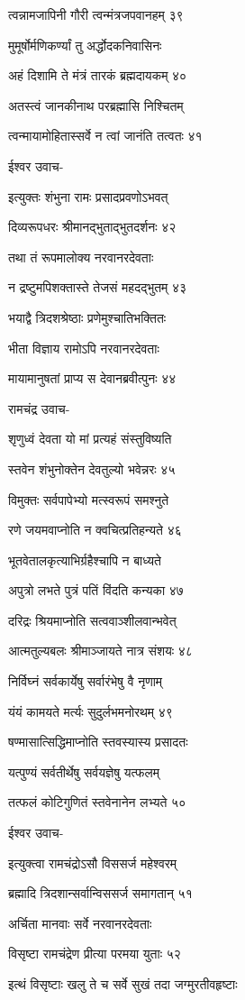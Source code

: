 त्वन्नामजापिनी गौरी त्वन्मंत्रजपवानहम् ३९

मुमूर्षोर्मणिकर्ण्यां तु अर्द्धोदकनिवासिनः

अहं दिशामि ते मंत्रं तारकं ब्रह्मदायकम् ४०

अतस्त्वं जानकीनाथ परब्रह्मासि निश्चितम्

त्वन्मायामोहितास्सर्वे न त्वां जानंति तत्वतः ४१

ईश्वर उवाच-

इत्युक्तः शंभुना रामः प्रसादप्रवणोऽभवत्

दिव्यरूपधरः श्रीमानद्भुताद्भुतदर्शनः ४२

तथा तं रूपमालोक्य नरवानरदेवताः

न द्रष्टुमपिशक्तास्ते तेजसं महदद्भुतम् ४३

भयाद्वै त्रिदशश्रेष्ठाः प्रणेमुश्चातिभक्तितः

भीता विज्ञाय रामोऽपि नरवानरदेवताः

मायामानुषतां प्राप्य स देवानब्रवीत्पुनः ४४

रामचंद्र उवाच-

शृणुध्वं देवता यो मां प्रत्यहं संस्तुविष्यति

स्तवेन शंभुनोक्तेन देवतुल्यो भवेन्नरः ४५

विमुक्तः सर्वपापेभ्यो मत्स्वरूपं समश्नुते

रणे जयमवाप्नोति न क्वचित्प्रतिहन्यते ४६

भूतवेतालकृत्याभिर्ग्रहैश्चापि न बाध्यते

अपुत्रो लभते पुत्रं पतिं विंदति कन्यका ४७

दरिद्रः श्रियमाप्नोति सत्ववाञ्शीलवान्भवेत्

आत्मतुल्यबलः श्रीमाञ्जायते नात्र संशयः ४८

निर्विघ्नं सर्वकार्येषु सर्वारंभेषु वै नृणाम्

यंयं कामयते मर्त्यः सुदुर्लभमनोरथम् ४९

षण्मासात्सिद्धिमाप्नोति स्तवस्यास्य प्रसादतः

यत्पुण्यं सर्वतीर्थेषु सर्वयज्ञेषु यत्फलम्

तत्फलं कोटिगुणितं स्तवेनानेन लभ्यते ५०

ईश्वर उवाच-

इत्युक्त्वा रामचंद्रोऽसौ विससर्ज महेश्वरम्

ब्रह्मादि त्रिदशान्सर्वान्विससर्ज समागतान् ५१

अर्चिता मानवाः सर्वे नरवानरदेवताः

विसृष्टा रामचंद्रेण प्रीत्या परमया युताः ५२

इत्थं विसृष्टाः खलु ते च सर्वे सुखं तदा जग्मुरतीवहृष्टाः

